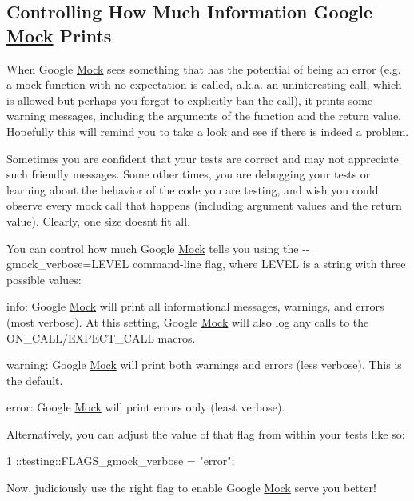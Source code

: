 \subsection*{Controlling How Much Information Google \hyperlink{class_mock}{Mock} Prints}

When Google \hyperlink{class_mock}{Mock} sees something that has the potential of being an error (e.\+g. a mock function with no expectation is called, a.\+k.\+a. an uninteresting call, which is allowed but perhaps you forgot to explicitly ban the call), it prints some warning messages, including the arguments of the function and the return value. Hopefully this will remind you to take a look and see if there is indeed a problem.

Sometimes you are confident that your tests are correct and may not appreciate such friendly messages. Some other times, you are debugging your tests or learning about the behavior of the code you are testing, and wish you could observe every mock call that happens (including argument values and the return value). Clearly, one size doesn\textquotesingle{}t fit all.

You can control how much Google \hyperlink{class_mock}{Mock} tells you using the {\ttfamily -\/-\/gmock\+\_\+verbose=L\+E\+V\+EL} command-\/line flag, where {\ttfamily L\+E\+V\+EL} is a string with three possible values\+:


\begin{DoxyItemize}
\item {\ttfamily info}\+: Google \hyperlink{class_mock}{Mock} will print all informational messages, warnings, and errors (most verbose). At this setting, Google \hyperlink{class_mock}{Mock} will also log any calls to the {\ttfamily O\+N\+\_\+\+C\+A\+L\+L/\+E\+X\+P\+E\+C\+T\+\_\+\+C\+A\+LL} macros.
\item {\ttfamily warning}\+: Google \hyperlink{class_mock}{Mock} will print both warnings and errors (less verbose). This is the default.
\item {\ttfamily error}\+: Google \hyperlink{class_mock}{Mock} will print errors only (least verbose).
\end{DoxyItemize}

Alternatively, you can adjust the value of that flag from within your tests like so\+:


\begin{DoxyCode}
1 ::testing::FLAGS\_gmock\_verbose = "error";
\end{DoxyCode}


Now, judiciously use the right flag to enable Google \hyperlink{class_mock}{Mock} serve you better!

